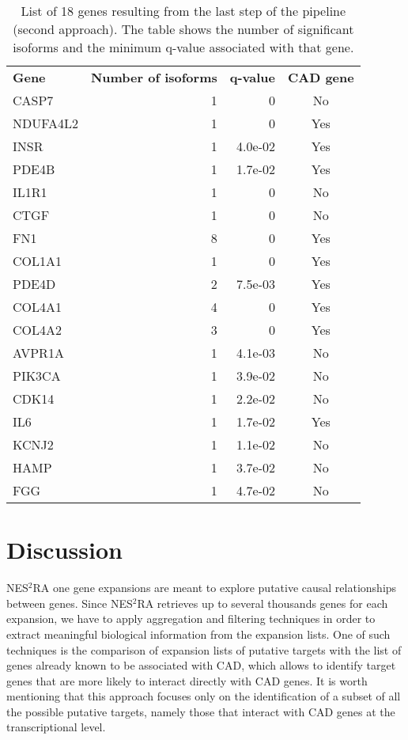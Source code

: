 \documentclass[fleqn,10pt]{SelfArx} %
\begin{document}
\begin{table}[!t]
	\centering
	\begin{tabularx}{\linewidth}{lRRc}
		\textbf{\color{white} Gene} & \textbf{\color{white} Number of isoforms} & \textbf{\color{white} q-value} & \textbf{\color{white}
			CAD gene}\\
		CASP7 &   1 & 0 & No \\ 
		NDUFA4L2 &   1 & 0 & Yes \\ 
		INSR &   1 & 4.0e-02 & Yes \\ 
		PDE4B &   1 & 1.7e-02 & Yes \\ 
		IL1R1 &   1 & 0 & No \\ 
		CTGF &   1 & 0 & No \\ 
		FN1 &   8 & 0 & Yes \\ 
		COL1A1 &   1 & 0 & Yes \\ 
		PDE4D &   2 & 7.5e-03 & Yes \\ 
		COL4A1 &   4 & 0 & Yes \\ 
		COL4A2 &   3 & 0 & Yes \\ 
		AVPR1A &   1 & 4.1e-03 & No \\ 
		PIK3CA &   1 & 3.9e-02 & No \\ 
		CDK14 &   1 & 2.2e-02 & No \\ 
		IL6 &   1 & 1.7e-02 & Yes \\ 
		KCNJ2 &   1 & 1.1e-02 & No \\
		\hline 
		HAMP &   1 & 3.7e-02 & No \\ 
		FGG &   1 & 4.7e-02 & No \\ 
	\end{tabularx}
	\smallskip
	\caption{List of 18 genes resulting from the last step of the pipeline (second approach). The table shows the number of significant isoforms and the minimum q-value associated with that gene.}
	\label{tab:sign18}
\end{table}

\section*{Discussion}

NES$^2$RA one gene expansions are meant to explore putative causal relationships between genes. Since NES$^2$RA retrieves up to several thousands genes for each expansion, we have to apply aggregation and filtering techniques in order to extract meaningful biological information from the expansion lists. One of such techniques is the comparison of expansion lists of putative targets with the list of genes already known to be associated with CAD, which allows to identify target genes that are more likely to interact directly with CAD genes. It is worth mentioning that this approach focuses only on the identification of a subset of all the possible putative targets, namely those that interact with CAD genes at the transcriptional level.
\end{document}
